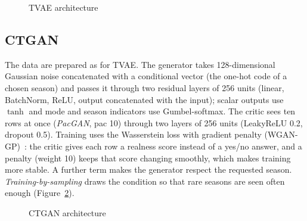 \documentclass[12pt,a4paper]{report}
\begin{document}
\begin{figure}[H]
\centering
{}
\caption{TVAE architecture}
\label{fig:arch-tvae}
\end{figure}

\subsection{CTGAN}
The data are prepared as for TVAE. The generator takes 128-dimensional Gaussian noise concatenated with a conditional
vector (the one-hot code of a chosen season) and passes it through two residual layers of 256 units (linear,
BatchNorm, ReLU, output concatenated with the input); scalar outputs use $\tanh$ and mode and season indicators use
Gumbel-softmax. The critic sees ten rows at once (\emph{PacGAN}, pac 10) through two layers of 256 units (LeakyReLU 0.2,
dropout 0.5). Training uses the Wasserstein loss with gradient penalty (WGAN-GP)~\cite{gulrajani2017wgangp}: the critic gives each
row a realness score instead of a yes/no answer, and a penalty (weight 10) keeps that score changing smoothly, which
makes training more stable. A further term makes the generator respect the requested season. \emph{Training-by-sampling} draws
the condition so that rare seasons are seen often enough (Figure~\ref{fig:arch-ctgan}).

\begin{figure}[H]
\centering
{}
\caption{CTGAN architecture}
\label{fig:arch-ctgan}
\end{figure}
\end{document}
